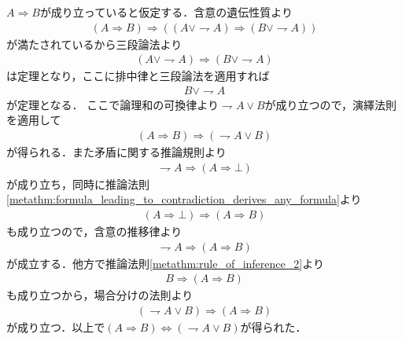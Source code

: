 	\begin{prf}
		$A \Longrightarrow B$が成り立っていると仮定する．含意の遺伝性質より
		\begin{align}
			(A \Longrightarrow B) \Longrightarrow 
			((A \vee \rightharpoondown A) \Longrightarrow (B \vee \rightharpoondown A))
		\end{align}
		が満たされているから三段論法より
		\begin{align}
			(A \vee \rightharpoondown A) \Longrightarrow (B \vee \rightharpoondown A)
		\end{align}
		は定理となり，ここに排中律と三段論法を適用すれば
		\begin{align}
			B \vee \rightharpoondown A
		\end{align}
		が定理となる．
		ここで論理和の可換律より$\rightharpoondown A \vee B$が成り立つので，演繹法則を適用して
		\begin{align}
			(A \Longrightarrow B) \Longrightarrow (\rightharpoondown A \vee B)
		\end{align}
		が得られる．また矛盾に関する推論規則より
		\begin{align}
			\rightharpoondown A \Longrightarrow (A \Longrightarrow \bot)
		\end{align}
		が成り立ち，同時に推論法則\ref{metathm:formula_leading_to_contradiction_derives_any_formula}より
		\begin{align}
			(A \Longrightarrow \bot) \Longrightarrow (A \Longrightarrow B)
		\end{align}
		も成り立つので，含意の推移律より
		\begin{align}
			\rightharpoondown A \Longrightarrow (A \Longrightarrow B)
		\end{align}
		が成立する．他方で推論法則\ref{metathm:rule_of_inference_2}より
		\begin{align}
			B \Longrightarrow (A \Longrightarrow B)
		\end{align}
		も成り立つから，場合分けの法則より
		\begin{align}
			(\rightharpoondown A \vee B) \Longrightarrow (A \Longrightarrow B)
		\end{align}
		が成り立つ．以上で$(A \Longrightarrow B) \Longleftrightarrow (\rightharpoondown A \vee B)$が得られた．
		\QED
	\end{prf}
	
	
